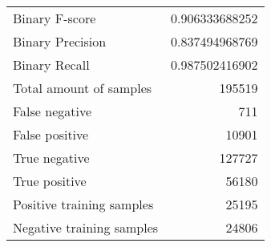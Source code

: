 \begin{table}[H]
\begin{minipage}{0.5\textwidth}
\begin{tabular}{l r}
\midrule
Binary F-score & 0.906333688252 \\
Binary Precision & 0.837494968769 \\
Binary Recall & 0.987502416902 \\
\midrule
Total amount of samples & 195519 \\
False negative & 711 \\
False positive & 10901 \\
True negative & 127727 \\
True positive & 56180 \\
\midrule
Positive training samples & 25195 \\
Negative training samples & 24806 \\
\bottomrule
\end{tabular}
\end{minipage}
\end{table}




